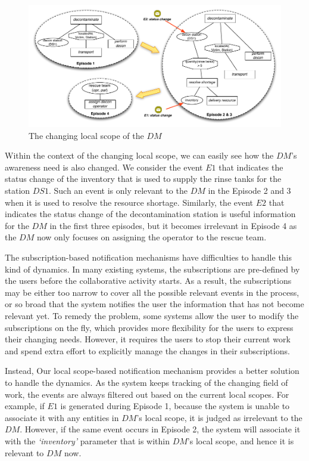 \begin{figure}[htbp] %
	\centering
	\includegraphics[width=5.8in]{case_2_dm.pdf} 
	\caption{The changing local scope of the $DM$}
	\label{fig:case_2_dm}
\end{figure}

Within the context of the changing local scope, we can easily see how the $DM$'s awareness need is also changed. We consider the event $E1$ that indicates the status change of the inventory that is used to supply the rinse tanks for the station $DS1$. Such an event is only relevant to the $DM$ in the Episode 2 and 3 when it is used to resolve the resource shortage. Similarly, the event $E2$ that indicates the status change of the decontamination station is useful information for the $DM$ in the first three episodes, but it becomes irrelevant in Episode 4 as the $DM$ now only focuses on assigning the operator to the rescue team.

The subscription-based notification mechanisms have difficulties to handle this kind of dynamics. In many existing systems, the subscriptions are pre-defined by the users before the collaborative activity starts. As a result, the subscriptions may be either too narrow to cover all the possible relevant events in the process, or so broad that the system notifies the user the information that has not become relevant yet. To remedy the problem, some systems allow the user to modify the subscriptions on the fly, which provides more flexibility for the users to express their changing needs. However, it requires the users to stop their current work and spend extra effort to explicitly manage the changes in their subscriptions.

Instead, Our local scope-based notification mechanism provides a better solution to handle the dynamics. As the system keeps tracking of the changing field of work, the events are always filtered out based on the current local scopes. For example, if $E1$ is generated during Episode 1, because the system is unable to associate it with any entities in $DM$'s local scope, it is judged as irrelevant to the $DM$. However, if the same event occurs in Episode 2, the system will associate it with the \emph{`inventory'} parameter that is within $DM$'s local scope, and hence it is relevant to $DM$ now.

